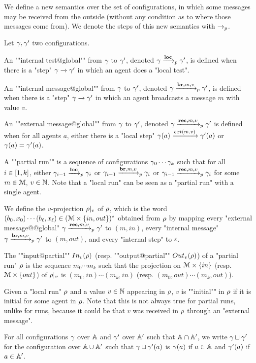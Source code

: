 We define a new semantics over the set of configurations, in which some messages may be received from the outside (without any condition as to where those messages come from). We denote the steps of this new semantics with $\xrightarrow{}_{p}$.  
\begin{definition}
	Let $\gamma, \gamma'$ two configurations. 

	An ""internal test@global"" from $\gamma$ to $\gamma'$, denoted $\gamma \xrightarrow{\textbf{loc}}_{p} \gamma'$, is defined when there is a "step" $\gamma \xrightarrow{} \gamma'$ in which an agent does a "local test". 
	
	An ""internal message@global"" from $\gamma$ to $\gamma'$, denoted $\gamma \xrightarrow{\textbf{br}, m, v}_{p} \gamma'$, is defined when there is a "step" $\gamma \xrightarrow{} \gamma'$ in which an agent broadcasts a message $m$ with value $v$. 
	
	An ""external message@global"" from $\gamma$ to $\gamma'$, denoted $\gamma \xrightarrow{\textbf{rec}, m, v}_{p} \gamma'$ is defined when for all agents $a$, either there is a "local step" $\config(a) \extbr{m}{v} \config'(a)$ or $\gamma(a) = \gamma'(a)$.
	
	A ""partial run"" is a sequence of configurations $\gamma_0 \cdots \gamma_k$  such that for all $i \in [1,k]$, either $\gamma_{i-1} \xrightarrow{\textbf{loc}}_{p} \gamma_{i}$ or $\gamma_{i-1} \xrightarrow{\textbf{br}, m, v}_{p} \gamma_{i}$ or $\gamma_{i-1} \xrightarrow{\textbf{rec}, m, v}_{p} \gamma_{i}$ for some $m \in \mathcal{M}$, $v\in \mathbb{N}$. 
	Note that a "local run" can be seen as a "partial run" with a single agent.

	
	We define the $v$-projection ${\rho}|_{v}$ of $\rho$, which is the word $(b_0, x_0) \cdots (b_\ell, x_\ell) \in (\mathcal{M} \times \{in, out\})^*$ obtained from $\rho$ by mapping every "external message@@global" $\gamma \xrightarrow{\textbf{rec}, m, v}_{p} \gamma'$ to $(m, in)$, every "internal message" $\gamma \xrightarrow{\textbf{br}, m, v}_{p} \gamma'$ to $(m, out)$, and every "internal step" to $\varepsilon$.
	
	The ""input@partial"" $\vinput{v}{\run}$ (resp. ""output@partial"" $\voutput{v}{\run}$) of a "partial run" $\rho$ is the sequence $m_0 \cdots m_k$ such that the projection on $\mathcal{M} \times \{in\}$ (resp. $\mathcal{M}\times \{out\}$) of ${\rho}|_{v}$ is $(m_0, in) \cdots (m_k, in)$ (resp. $(m_0, out)\cdots(m_k, out)$).
	
	Given a "local run" $\rho$ and a value $v \in \mathbb{N}$ appearing in $\rho$, $v$ is ""initial"" in $\rho$ if it is initial for some agent in $\rho$. Note that this is not always true for partial runs, unlike for runs, because it could be that $v$ was received in $\rho$ through an "external message". 

	For all configurations $\gamma$ over $\mathbb{A}$ and $\gamma'$ over $\mathbb{A}'$ such that $\mathbb{A} \cap \mathbb{A}'$, we write $\gamma \sqcup \gamma'$ for the configuration over $\mathbb{A} \cup \mathbb{A}'$ such that $\gamma \sqcup \gamma'(a)$ is $\gamma(a)$ if $a \in \mathbb{A}$ and $\gamma'(a)$ if $a \in \mathbb{A}'$. 

	\end{definition}

